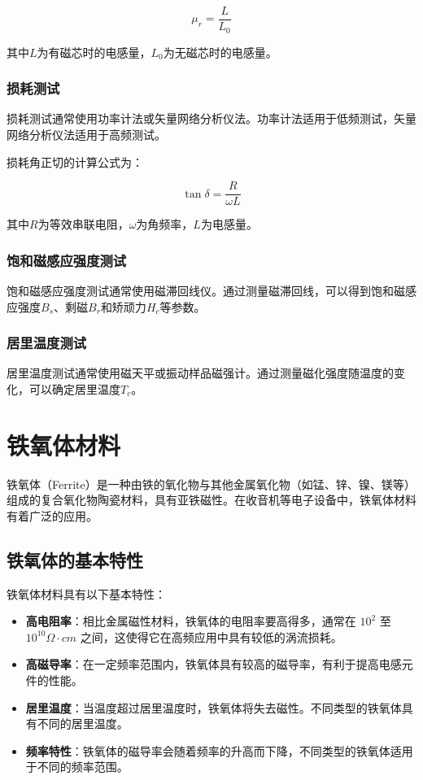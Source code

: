 \documentclass[12pt,UTF8]{ctexbook}
\begin{document}
$$ \mu_r = \frac{L}{L_0} $$

其中$L$为有磁芯时的电感量，$L_0$为无磁芯时的电感量。

\subsection{损耗测试}

损耗测试通常使用功率计法或矢量网络分析仪法。功率计法适用于低频测试，矢量网络分析仪法适用于高频测试。

损耗角正切的计算公式为：

$$ \tan\delta = \frac{R}{\omega L} $$

其中$R$为等效串联电阻，$\omega$为角频率，$L$为电感量。

\subsection{饱和磁感应强度测试}

饱和磁感应强度测试通常使用磁滞回线仪。通过测量磁滞回线，可以得到饱和磁感应强度$B_s$、剩磁$B_r$和矫顽力$H_c$等参数。

\subsection{居里温度测试}

居里温度测试通常使用磁天平或振动样品磁强计。通过测量磁化强度随温度的变化，可以确定居里温度$T_c$。

\chapter{铁氧体材料}

铁氧体（Ferrite）是一种由铁的氧化物与其他金属氧化物（如锰、锌、镍、镁等）组成的复合氧化物陶瓷材料，具有亚铁磁性。在收音机等电子设备中，铁氧体材料有着广泛的应用。

\section{铁氧体的基本特性}

铁氧体材料具有以下基本特性：

\begin{itemize}[leftmargin=2cm]
    \item \textbf{高电阻率}：相比金属磁性材料，铁氧体的电阻率要高得多，通常在 $10^2$ 至 $10^{10} \Omega\cdot cm$ 之间，这使得它在高频应用中具有较低的涡流损耗。
    \item \textbf{高磁导率}：在一定频率范围内，铁氧体具有较高的磁导率，有利于提高电感元件的性能。
    \item \textbf{居里温度}：当温度超过居里温度时，铁氧体将失去磁性。不同类型的铁氧体具有不同的居里温度。
    \item \textbf{频率特性}：铁氧体的磁导率会随着频率的升高而下降，不同类型的铁氧体适用于不同的频率范围。
\end{itemize}
\end{document}
